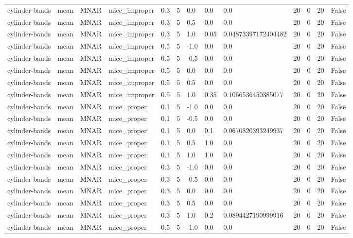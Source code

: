 \begin{tabular}{lllllllllllll}
cylinder-bands & mean & MNAR & mice\_improper & 0.3 & 5 & 0.0 & 0.0 & 0.0 & 20 & 0 & 20 & False \\
cylinder-bands & mean & MNAR & mice\_improper & 0.3 & 5 & 0.5 & 0.0 & 0.0 & 20 & 0 & 20 & False \\
cylinder-bands & mean & MNAR & mice\_improper & 0.3 & 5 & 1.0 & 0.05 & 0.04873397172404482 & 20 & 0 & 20 & False \\
cylinder-bands & mean & MNAR & mice\_improper & 0.5 & 5 & -1.0 & 0.0 & 0.0 & 20 & 0 & 20 & False \\
cylinder-bands & mean & MNAR & mice\_improper & 0.5 & 5 & -0.5 & 0.0 & 0.0 & 20 & 0 & 20 & False \\
cylinder-bands & mean & MNAR & mice\_improper & 0.5 & 5 & 0.0 & 0.0 & 0.0 & 20 & 0 & 20 & False \\
cylinder-bands & mean & MNAR & mice\_improper & 0.5 & 5 & 0.5 & 0.0 & 0.0 & 20 & 0 & 20 & False \\
cylinder-bands & mean & MNAR & mice\_improper & 0.5 & 5 & 1.0 & 0.35 & 0.1066536450385077 & 20 & 0 & 20 & False \\
cylinder-bands & mean & MNAR & mice\_proper & 0.1 & 5 & -1.0 & 0.0 & 0.0 & 20 & 0 & 20 & False \\
cylinder-bands & mean & MNAR & mice\_proper & 0.1 & 5 & -0.5 & 0.0 & 0.0 & 20 & 0 & 20 & False \\
cylinder-bands & mean & MNAR & mice\_proper & 0.1 & 5 & 0.0 & 0.1 & 0.0670820393249937 & 20 & 0 & 20 & False \\
cylinder-bands & mean & MNAR & mice\_proper & 0.1 & 5 & 0.5 & 1.0 & 0.0 & 20 & 0 & 20 & False \\
cylinder-bands & mean & MNAR & mice\_proper & 0.1 & 5 & 1.0 & 1.0 & 0.0 & 20 & 0 & 20 & False \\
cylinder-bands & mean & MNAR & mice\_proper & 0.3 & 5 & -1.0 & 0.0 & 0.0 & 20 & 0 & 20 & False \\
cylinder-bands & mean & MNAR & mice\_proper & 0.3 & 5 & -0.5 & 0.0 & 0.0 & 20 & 0 & 20 & False \\
cylinder-bands & mean & MNAR & mice\_proper & 0.3 & 5 & 0.0 & 0.0 & 0.0 & 20 & 0 & 20 & False \\
cylinder-bands & mean & MNAR & mice\_proper & 0.3 & 5 & 0.5 & 0.0 & 0.0 & 20 & 0 & 20 & False \\
cylinder-bands & mean & MNAR & mice\_proper & 0.3 & 5 & 1.0 & 0.2 & 0.0894427190999916 & 20 & 0 & 20 & False \\
cylinder-bands & mean & MNAR & mice\_proper & 0.5 & 5 & -1.0 & 0.0 & 0.0 & 20 & 0 & 20 & False \\

\end{tabular}

